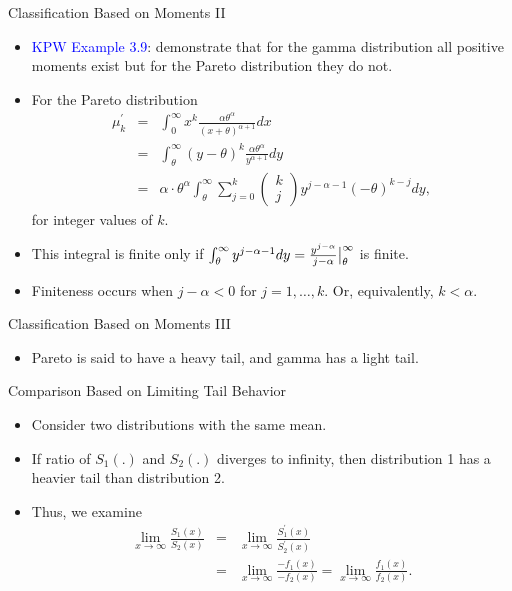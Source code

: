\documentclass{beamer}
\begin{document}
\begin{frame}{Classification Based on Moments II}
\begin{itemize}
\item \textcolor{blue}{KPW Example 3.9}: demonstrate that for the gamma distribution all positive moments exist but for the Pareto distribution they do not.
\item For the Pareto distribution
\begin{eqnarray*}
\mu_k^{'} &=& \int_0^{\infty} x^k \frac{\alpha \theta^{\alpha}}{(x+\theta)^{\alpha+1}} dx \\
&=& \int_{\theta}^{\infty} (y-\theta)^k \frac{\alpha \theta^{\alpha}}{y^{\alpha+1}} dy \\
&=& \alpha \cdot \theta^{\alpha} \int_{\theta}^{\infty} \sum_{j=0}^k \left(\begin{array}{c}
                                                                             k \\
                                                                             j
                                                                           \end{array} \right) y^{j-\alpha-1} (-\theta)^{k-j} dy,
\end{eqnarray*}
for integer values of $k$.
\vspace{0.3cm}
\item[] This integral is finite only if $\int_{\theta}^{\infty} y^{j-\alpha-1} dy = \frac{y^{j-\alpha}}{j-\alpha}\big{|}_{\theta}^{\infty}$ is finite.
\item[] Finiteness occurs when $j-\alpha < 0$ for $j=1, \ldots,k$. Or, equivalently, $k< \alpha$.
\end{itemize}
\end{frame}

\begin{frame}{Classification Based on Moments III}
\begin{itemize}
\item Pareto is said to have a heavy tail, and gamma has a light tail.
\end{itemize}
\end{frame}

\begin{frame}{Comparison Based on Limiting Tail Behavior}
\begin{itemize}
\item Consider two distributions with the same mean.
\vspace{0.3cm}
\item If ratio of $S_1(.)$ and $S_2(.)$ diverges to infinity, then distribution 1 has a heavier tail than distribution 2.
\vspace{0.3cm}
\item Thus, we examine
\begin{eqnarray*}
\lim_{x\to \infty} \frac{S_1(x)}{S_2(x)} &=& \lim_{x \to \infty} \frac{S_1^{'}(x)}{S_2^{'}(x)} \\
&=& \lim_{x \to \infty} \frac{-f_1(x)}{-f_2(x)} = \lim_{x\to \infty} \frac{f_1(x)}{f_2(x)}.
\end{eqnarray*}
\end{itemize}
\end{frame}
\end{document}
